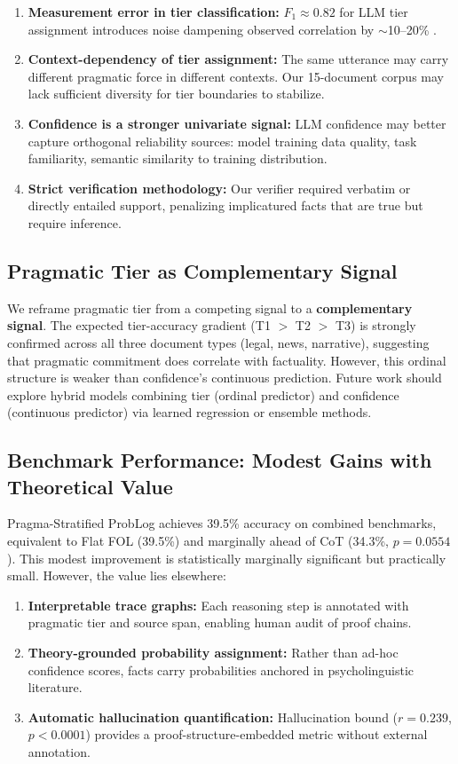 \documentclass[11pt,letterpaper]{article}
\begin{document}
\begin{enumerate}
  \item \textbf{Measurement error in tier classification:} $F_1\approx0.82$ for LLM tier assignment introduces noise dampening observed correlation by $\sim$10--20\% \citep{Spearman1910}.
  \item \textbf{Context-dependency of tier assignment:} The same utterance may carry different pragmatic force in different contexts. Our 15-document corpus may lack sufficient diversity for tier boundaries to stabilize.
  \item \textbf{Confidence is a stronger univariate signal:} LLM confidence may better capture orthogonal reliability sources: model training data quality, task familiarity, semantic similarity to training distribution.
  \item \textbf{Strict verification methodology:} Our verifier required verbatim or directly entailed support, penalizing implicatured facts that are true but require inference.
\end{enumerate}

\subsection{Pragmatic Tier as Complementary Signal}

We reframe pragmatic tier from a competing signal to a \textbf{complementary signal}. The expected tier-accuracy gradient (T1 $>$ T2 $>$ T3) is strongly confirmed across all three document types (legal, news, narrative), suggesting that pragmatic commitment does correlate with factuality. However, this ordinal structure is weaker than confidence's continuous prediction. Future work should explore hybrid models combining tier (ordinal predictor) and confidence (continuous predictor) via learned regression or ensemble methods.

\subsection{Benchmark Performance: Modest Gains with Theoretical Value}

Pragma-Stratified ProbLog achieves 39.5\% accuracy on combined benchmarks, equivalent to Flat FOL (39.5\%) and marginally ahead of CoT (34.3\%, $p=0.0554$). This modest improvement is statistically marginally significant but practically small. However, the value lies elsewhere:

\begin{enumerate}
  \item \textbf{Interpretable trace graphs:} Each reasoning step is annotated with pragmatic tier and source span, enabling human audit of proof chains.
  \item \textbf{Theory-grounded probability assignment:} Rather than ad-hoc confidence scores, facts carry probabilities anchored in psycholinguistic literature.
  \item \textbf{Automatic hallucination quantification:} Hallucination bound ($r=0.239$, $p<0.0001$) provides a proof-structure-embedded metric without external annotation.
\end{enumerate}
\end{document}
